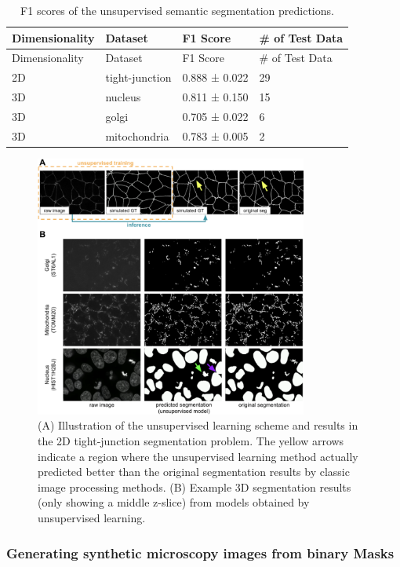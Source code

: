 \begin{longtable}[]{@{}llll@{}}
\caption{F1 scores of the unsupervised semantic segmentation predictions. \label{tbl:unsuper}}\label{tbl:unsuper}\tabularnewline
\toprule()
Dimensionality & Dataset & F1 Score & \# of Test Data \\
\midrule()
\endfirsthead
\toprule()
Dimensionality & Dataset & F1 Score & \# of Test Data \\
\midrule()
\endhead
2D & tight-junction & 0.888 ± 0.022 & 29 \\
3D & nucleus & 0.811 ± 0.150 & 15 \\
3D & golgi & 0.705 ± 0.022 & 6 \\
3D & mitochondria & 0.783 ± 0.005 & 2 \\
\bottomrule()
\end{longtable}

\begin{figure}
\hypertarget{fig:unsupervised}{%
\centering
\includegraphics[width=0.8\textwidth,height=\textheight]{images/unsupervised.png}
\caption{(A) Illustration of the unsupervised learning scheme and results in the 2D tight-junction segmentation problem. The yellow arrows indicate a region where the unsupervised learning method actually predicted better than the original segmentation results by classic image processing methods. (B) Example 3D segmentation results (only showing a middle z-slice) from models obtained by unsupervised learning.}\label{fig:unsupervised}
}
\end{figure}

\hypertarget{generating-synthetic-microscopy-images-from-binary-masks}{%
\subsubsection{Generating synthetic microscopy images from binary Masks}\label{generating-synthetic-microscopy-images-from-binary-masks}}

